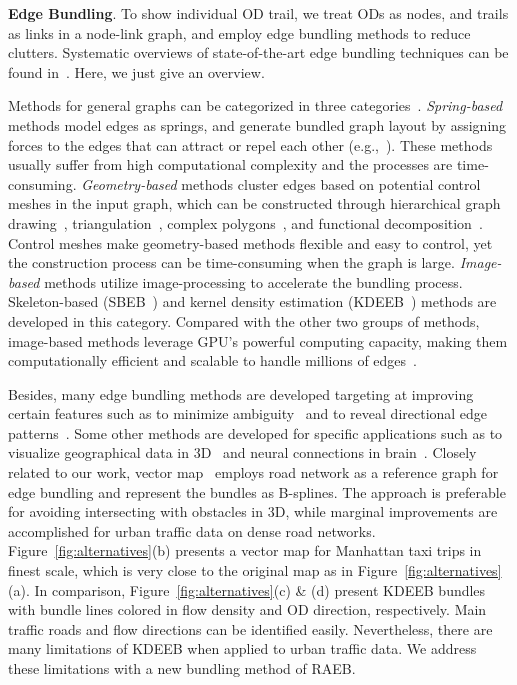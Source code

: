 \noindent
\textbf{Edge Bundling}.
To show individual OD trail, we treat ODs as nodes, and trails as links in a node-link graph, and employ edge bundling methods to reduce clutters.
Systematic overviews of state-of-the-art edge bundling techniques can be found in~\cite{zhou2013edge, lhuillier2017state}.
Here, we just give an overview.

Methods for general graphs can be categorized in three categories~\cite{zhou2013edge}.
\textit{Spring-based} methods model edges as springs, and generate bundled graph layout by assigning forces to the edges that can attract or repel each other (e.g.,~\cite{holten2009force}).
These methods usually suffer from high computational complexity and the processes are time-consuming.
\textit{Geometry-based} methods cluster edges based on potential control meshes in the input graph, which can be constructed through hierarchical graph drawing~\cite{holten2006hierarchical}, triangulation~\cite{zhou2008energy, lambert2010winding}, complex polygons~\cite{cui2008geometry}, and functional decomposition~\cite{hurter_2018_functional}.
Control meshes make geometry-based methods flexible and easy to control, yet the construction process can be time-consuming when the graph is large. 
\textit{Image-based} methods utilize image-processing to accelerate the bundling process.
Skeleton-based (SBEB~\cite{ersoy2011skeleton}) and kernel density estimation (KDEEB~\cite{hurter2012graph}) methods are developed in this category.
Compared with the other two groups of methods, image-based methods leverage GPU's powerful computing capacity, making them computationally efficient and scalable to handle millions of edges~\cite{van2016cubu, lhuillier2017ffteb}.

Besides, many edge bundling methods are developed targeting at improving certain features such as to minimize ambiguity~\cite{luo2012ambiguity, bach_2017_towards} and to reveal directional edge patterns~\cite{selassie_2011_divided}.
Some other methods are developed for specific applications such as to visualize geographical data in 3D~\cite{lambert20103d, thony2015vector} and neural connections in brain~\cite{2014_bottger_three-d, yang2016blockwise}.
Closely related to our work, vector map~\cite{thony2015vector} employs road network as a reference graph for edge bundling and represent the bundles as B-splines.
The approach is preferable for avoiding intersecting with obstacles in 3D, while marginal improvements are accomplished for urban traffic data on dense road networks.
Figure~\ref{fig:alternatives}(b) presents a vector map for Manhattan taxi trips in finest scale, which is very close to the original map as in Figure~\ref{fig:alternatives}(a).
In comparison, Figure~\ref{fig:alternatives}(c) \& (d) present KDEEB bundles with bundle lines colored in flow density and OD direction, respectively.
Main traffic roads and flow directions can be identified easily.
Nevertheless, there are many limitations of KDEEB when applied to urban traffic data.
We address these limitations with a new bundling method of RAEB.
